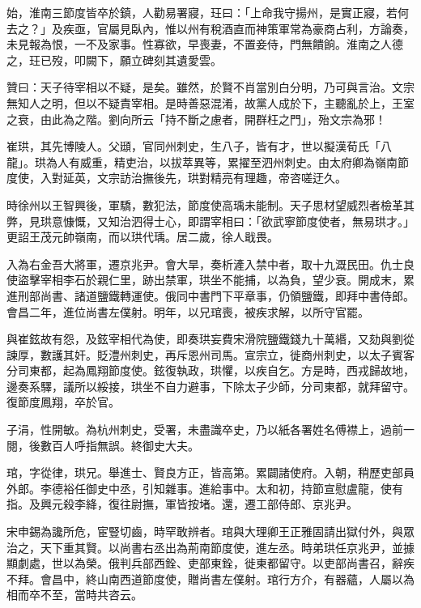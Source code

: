 \begin{pinyinscope}
 始，淮南三節度皆卒於鎮，人勸易署寢，玨曰：「上命我守揚州，是實正寢，若何去之？」及疾亟，官屬見臥內，惟以州有稅酒直而神策軍常為豪商占利，方論奏，未見報為恨，一不及家事。性寡欲，早喪妻，不置妾侍，門無饋餉。淮南之人德之，玨已歿，叩闕下，願立碑刻其遺愛雲。



 贊曰：天子待宰相以不疑，是矣。雖然，於賢不肖當別白分明，乃可與言治。文宗無知人之明，但以不疑責宰相。是時善惡混淆，故黨人成於下，主聽亂於上，王室之衰，由此為之階。劉向所云「持不斷之慮者，開群枉之門」，殆文宗為邪！



 崔珙，其先博陵人。父頲，官同州刺史，生八子，皆有才，世以擬漢荀氏「八龍」。珙為人有威重，精吏治，以拔萃異等，累擢至泗州刺史。由太府卿為嶺南節度使，入對延英，文宗訪治撫後先，珙對精亮有理趣，帝咨嗟迂久。



 時徐州以王智興後，軍驕，數犯法，節度使高瑀未能制。天子思材望威烈者檢革其弊，見珙意慷慨，又知治泗得士心，即謂宰相曰：「欲武寧節度使者，無易珙才。」更詔王茂元帥嶺南，而以珙代瑀。居二歲，徐人戢畏。



 入為右金吾大將軍，遷京兆尹。會大旱，奏析滻入禁中者，取十九溉民田。仇士良使盜擊宰相李石於親仁里，跡出禁軍，珙坐不能捕，以為負，望少衰。開成末，累進刑部尚書、諸道鹽鐵轉運使。俄同中書門下平章事，仍領鹽鐵，即拜中書侍郎。會昌二年，進位尚書左僕射。明年，以兄琯喪，被疾求解，以所守官罷。



 與崔鉉故有怨，及鉉宰相代為使，即奏珙妄費宋滑院鹽鐵錢九十萬緡，又劾與劉從諫厚，數護其奸。貶澧州刺史，再斥恩州司馬。宣宗立，徙商州刺史，以太子賓客分司東都，起為鳳翔節度使。鉉復執政，珙懼，以疾自乞。方是時，西戎歸故地，邊奏系驛，議所以綏接，珙坐不自力避事，下除太子少師，分司東都，就拜留守。復節度鳳翔，卒於官。



 子涓，性開敏。為杭州刺史，受署，未盡識卒史，乃以紙各署姓名傅襟上，過前一閱，後數百人呼指無誤。終御史大夫。



 琯，字從律，珙兄。舉進士、賢良方正，皆高第。累闢諸使府。入朝，稍歷吏部員外郎。李德裕任御史中丞，引知雜事。進給事中。太和初，持節宣慰盧龍，使有指。及興元殺李絳，復往尉撫，軍皆按堵。還，遷工部侍郎、京兆尹。



 宋申錫為讒所危，宦豎切齒，時罕敢辨者。琯與大理卿王正雅固請出獄付外，與眾治之，天下重其賢。以尚書右丞出為荊南節度使，進左丞。時弟珙任京兆尹，並據顯劇處，世以為榮。俄判兵部西銓、吏部東銓，徙東都留守。以吏部尚書召，辭疾不拜。會昌中，終山南西道節度使，贈尚書左僕射。琯行方介，有器蘊，人屬以為相而卒不至，當時共咨云。




\end{pinyinscope}
